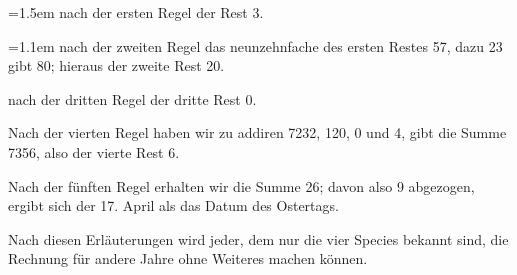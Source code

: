\begingroup\leftskip=1.5em\parindent=0pt
nach der ersten Regel der Rest 3.\par
\hangindent=1.1em nach der zweiten Regel das neunzehnfache des ersten Restes 57, dazu
23 gibt 80; hieraus der zweite Rest 20.\par
nach der dritten Regel der dritte Rest 0.\par
\endgroup

Nach der vierten Regel haben wir zu addiren 7232, 120, 0 und 4, gibt
die Summe 7356, also der vierte Rest 6.

Nach der fünften Regel erhalten wir die Summe 26; davon also 9 abgezogen,
ergibt sich der 17. April als das Datum des Ostertags.

Nach diesen Erläuterungen wird jeder, dem nur die vier Species bekannt
sind, die Rechnung für andere Jahre ohne Weiteres machen können.

